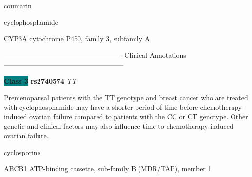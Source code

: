 \documentclass{resume} %
\begin{document}
\begin{rSection}{ coumarin }
\end{rSection}\begin{rSection}{ cyclophosphamide }
\item[]

\begin{rSubsection}{ CYP3A }{ cytochrome P450, family 3, subfamily A }{}{}
\item[]

\item[] ---------------------------------------------------- Clinical Annotations -----------------------------------------------------\newline
\item \textbf{\colorbox{teal} {Class 3}} \textbf{ rs2740574 } \textit{ TT }
\item[] Premenopausal patients with the TT genotype and breast cancer who are treated with cyclophosphamide may have a shorter period of time before chemotherapy-induced ovarian failure compared to patients with the CC or CT genotype. Other genetic and clinical factors may also influence time to chemotherapy-induced ovarian failure.
\end{rSubsection}

\end{rSection}\begin{rSection}{ cyclosporine }
\item[]

\begin{rSubsection}{ ABCB1 }{ ATP-binding cassette, sub-family B (MDR/TAP), member 1 }{}{}
\item[]


\end{rSubsection}
\end{rSection}
\end{document}
